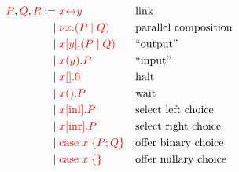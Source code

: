 \begin{definition}[Terms]\label{def:cp-terms}
  \[\!
    \begin{aligned}
      \textcolor{red}{P}, \textcolor{red}{Q}, \textcolor{red}{R}
           :=& \; \textcolor{red}{x{\leftrightarrow}y}       &&\text{link}
      \\ \mid& \; \textcolor{red}{\nu x.(P \mid Q)}     &&\text{parallel composition}
      \\ \mid& \; \textcolor{red}{x[y].(P \mid Q)} &&\text{``output''}
      \\ \mid& \; \textcolor{red}{x(y).P}    &&\text{``input''}
      \\ \mid& \; \textcolor{red}{x[].0}          &&\text{halt}
      \\ \mid& \; \textcolor{red}{x().P}       &&\text{wait}
      \\ \mid& \; \textcolor{red}{x[\text{inl}].P}        &&\text{select left choice}
      \\ \mid& \; \textcolor{red}{x[\text{inr}].P}        &&\text{select right choice}
      \\ \mid& \; \textcolor{red}{\text{case}\;x\;\{P;Q\}}    &&\text{offer binary choice}
      \\ \mid& \; \textcolor{red}{\text{case}\;x\;\{\}}        &&\text{offer nullary choice}
    \end{aligned}
  \]  
\end{definition}
